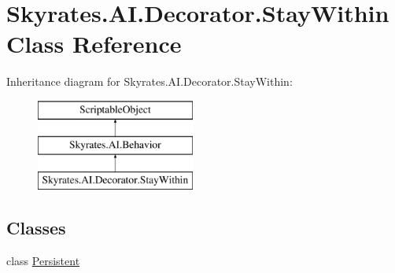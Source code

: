 \hypertarget{class_skyrates_1_1_a_i_1_1_decorator_1_1_stay_within}{\section{Skyrates.\-A\-I.\-Decorator.\-Stay\-Within Class Reference}
\label{class_skyrates_1_1_a_i_1_1_decorator_1_1_stay_within}
}
Inheritance diagram for Skyrates.\-A\-I.\-Decorator.\-Stay\-Within\-:\begin{figure}[H]
\begin{center}
\leavevmode
\includegraphics[height=3.000000cm]{class_skyrates_1_1_a_i_1_1_decorator_1_1_stay_within}
\end{center}
\end{figure}
\subsection*{Classes}
\begin{DoxyCompactItemize}
\item 
class \hyperlink{class_skyrates_1_1_a_i_1_1_decorator_1_1_stay_within_1_1_persistent}{Persistent}
\end{DoxyCompactItemize}
